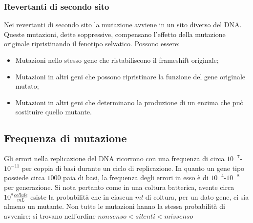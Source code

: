 		\subsubsection{Revertanti di secondo sito}
		Nei revertanti di secondo sito la mutazione avviene in un sito diverso del DNA.
		Queste mutazioni, dette soppressive, compensano l'effetto della mutazione originale ripristinando il fenotipo selvatico.
		Possono essere:
		\begin{multicols}{2}
	    		\begin{itemize}
	        		\item Mutazioni nello stesso gene che ristabiliscono il frameshift originale;
	        		\item Mutazioni in altri geni che possono ripristinare la funzione del gene originale mutato; 
	        		\item Mutazioni in altri geni che determinano la produzione di un enzima che può sostituire quello mutante. 
	    		\end{itemize}
		\end{multicols}

	\subsection{Frequenza di mutazione}
	Gli errori nella replicazione del DNA ricorrono con una frequenza di circa $10^{-7}$-$10^{-11}$ per coppia di basi durante un ciclo di replicazione. 
	In quanto un gene tipo possiede circa $1000$ paia di basi, la frequenza degli errori in esso \`e di $10^{-4}$-$10^{-8}$ per generazione. 
	Si nota pertanto come in una coltura batterica, avente circa $10^{8}\frac{cellule}{\si{mL}}$ esiste la probabilità che in ciascun $\si{ml}$ di coltura, per un dato gene, ci sia almeno un mutante. 
	Non tutte le mutazioni hanno la stessa probabilit\`a di avvenire: si trovano nell'ordine $nonsenso<silenti<missenso$

